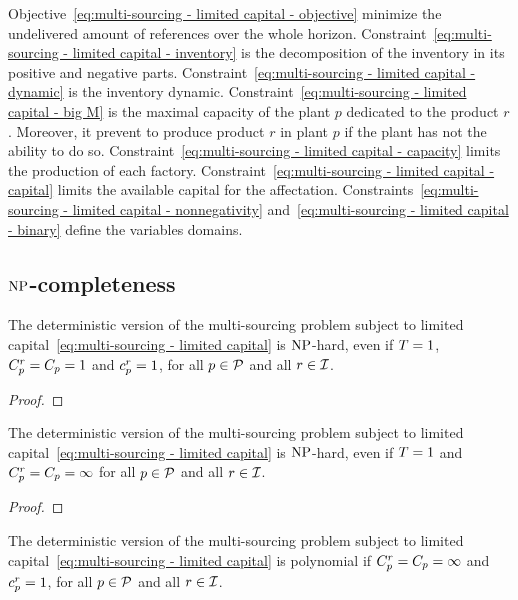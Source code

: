 Objective~\eqref{eq:multi-sourcing - limited capital - objective} minimize the undelivered amount of references over the whole horizon.
Constraint~\eqref{eq:multi-sourcing - limited capital - inventory} is the decomposition of the inventory in its positive and negative parts.
Constraint~\eqref{eq:multi-sourcing - limited capital - dynamic} is the inventory dynamic.
Constraint~\eqref{eq:multi-sourcing - limited capital - big M} is the maximal capacity of the plant $p$ dedicated to the product $r$. Moreover, it prevent to produce product $r$ in plant $p$ if the plant has not the ability to do so.
Constraint~\eqref{eq:multi-sourcing - limited capital - capacity} limits the production of each factory.
Constraint~\eqref{eq:multi-sourcing - limited capital - capital} limits the available capital for the affectation.
Constraints~\eqref{eq:multi-sourcing - limited capital - nonnegativity} and~\eqref{eq:multi-sourcing - limited capital - binary} define the variables domains.




\subsection{$\operatorname{NP}$-completeness}



\begin{prop}
The deterministic version of the multi-sourcing problem subject to limited capital~\eqref{eq:multi-sourcing - limited capital} is $\operatorname{NP}$-hard, even if $T=1$, $C_p^r=C_p=1$ and $c_p^r=1$, for all $p\in\mathcal{P}$ and all $r\in\mathcal{I}$.
\end{prop}

\begin{proof}
\tbc
\end{proof}


\begin{prop}
The deterministic version of the multi-sourcing problem subject to limited capital~\eqref{eq:multi-sourcing - limited capital} is $\operatorname{NP}$-hard, even if $T=1$ and $C_p^r=C_p=\infty$ for all $p\in\mathcal{P}$ and all $r\in\mathcal{I}$.
\end{prop}

\begin{proof}
\tbc
\end{proof}


\begin{prop}
The deterministic version of the multi-sourcing problem subject to limited capital~\eqref{eq:multi-sourcing - limited capital} is polynomial if $C_p^r=C_p=\infty$ and $c_p^r=1$, for all $p\in\mathcal{P}$ and all $r\in\mathcal{I}$.
\end{prop}

